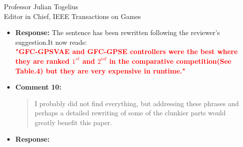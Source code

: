 \documentclass[10pt]{letter} %
\begin{document}
\begin{letter}{Professor Julian Togelius \\ Editor in Chief, IEEE Transactions on Games}
\begin{enumerate}
\begin{itemize}
\begin{quote}
			\end{quote}	
		\item {\bf Response:} 
			The sentence has been rewritten following the reviewer's suggestion.It now reads:\\
		\textcolor{red}{	{\bf "GFC-GPSVAE and GFC-GPSE controllers were the best where 	they are ranked $1^{st}$ and $2^{nd}$ in the comparative competition(See Table.4) but they are very expensive in runtime."}}	
		\item {\bf Comment 10:}
			\begin{quote}
				I probably did not find everything, but addressing these phrases and perhaps a detailed rewriting of some of the clunkier parts would greatly benefit this paper.
			\end{quote}	
		\item {\bf Response:} 
    \end{itemize}

\newpage


\end{enumerate}
\end{letter}
\end{document}
